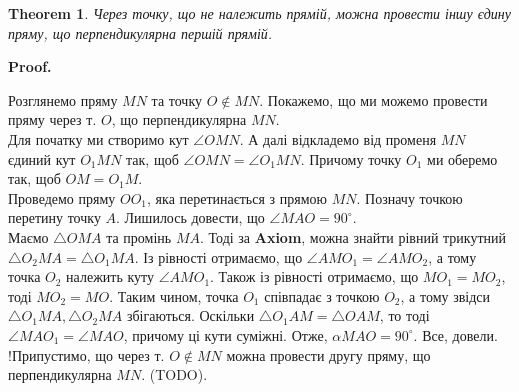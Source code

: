 \documentclass[a4paper, 10pt]{article}
\makeatletter
\def\qed{$\blacksquare$}
\theoremstyle{theoremdd}
\newtheorem{theorem}{Theorem}[subsection]
\theoremstyle{theoremdd}
\theoremstyle{theoremdd}
\theoremstyle{theoremdd}
\theoremstyle{theoremdd}
\theoremstyle{theoremdd}
\theoremstyle{theoremdd}
\theoremstyle{theoremdd}
\theoremstyle{theoremdd}
\newtheorem{corollary}[theorem]{Corollary}
\renewenvironment{proof}[1][Proof.\\]{\par
\pushQED{\hfill \qed}%
\normalfont \topsep6\p@\@plus6\p@\relax
\trivlist
\item\relax
{\bfseries
#1\@addpunct{.}}\hspace\labelsep\ignorespaces
}{%
\popQED\endtrivlist\@endpefalse
}
\makeatother
\begin{document}
\iffalse
\begin{corollary}
$\triangle A_1B_1C_1 = \triangle A_2B_2C_2 \iff$ кожний кут та кожна сторона першого трикутника дорівнює кожному куту та кожній стороні другого трикутника.
\end{corollary}

\textbf{Axiom.} Для заданого трикутника $ABC$ та заданого променя $A_1M$ існує трикутник $A_1B_1C_1$, який дорівнює $ABC$. Причому сторона $A_1B_1$ належить променю $A_1M$.
\bigskip \\
\textit{Треба трошки відволіктись та повернутись до перпендикулярних прямих.}
\fi

\begin{theorem}
Через точку, що не належить прямій, можна провести іншу єдину пряму, що перпендикулярна першій прямій.
\end{theorem}

\begin{proof}
Розглянемо пряму $MN$ та точку $O \not\in MN$. Покажемо, що ми можемо провести пряму через т. $O$, що перпендикулярна $MN$.\\
Для початку ми створимо кут $\angle OMN$. А далі відкладемо від променя $MN$ єдиний кут $O_1MN$ так, щоб $\angle OMN = \angle O_1MN$. Причому точку $O_1$ ми оберемо так, щоб $OM=O_1M$.\\
Проведемо пряму $OO_1$, яка перетинається з прямою $MN$. Позначу точкою перетину точку $A$. Лишилось довести, що $\angle MAO = 90^\circ$.\\
Маємо $\triangle OMA$ та промінь $MA$. Тоді за \textbf{Axiom}, можна знайти рівний трикутний $\triangle O_2MA = \triangle O_1MA$. Із рівності отримаємо, що $\angle AMO_1 = \angle AMO_2$, а тому точка $O_2$ належить куту $\angle AMO_1$. Також із рівності отримаємо, що $MO_1 = MO_2$, тоді $MO_2 = MO$. Таким чином, точка $O_1$ співпадає з точкою $O_2$, а тому звідси $\triangle O_1MA, \triangle O_2MA$ збігаються. Оскільки $\triangle O_1AM = \triangle OAM$, то тоді $\angle MAO_1 = \angle MAO$, причому ці кути суміжні. Отже, $\alpha MAO = 90^\circ$. Все, довели.
\bigskip \\
!Припустимо, що через т. $O \not \in MN$ можна провести другу пряму, що перпендикулярна $MN$. (TODO).
\end{proof}
\end{document}
